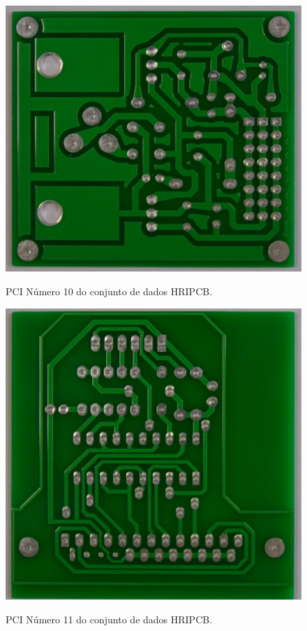 \begin{figure}[!h] %
  \centering
  \caption{PCI Número 10 do conjunto de dados HRIPCB.}
  \includegraphics[scale=0.13]{img/pcbs/10.JPG}
  \label{fig:ap-pcbs-10}
\end{figure}

\begin{figure}[!h] %
  \centering
  \caption{PCI Número 11 do conjunto de dados HRIPCB.}
  \includegraphics[scale=0.13]{img/pcbs/11.JPG}
  \label{fig:ap-pcbs-11}
\end{figure}

